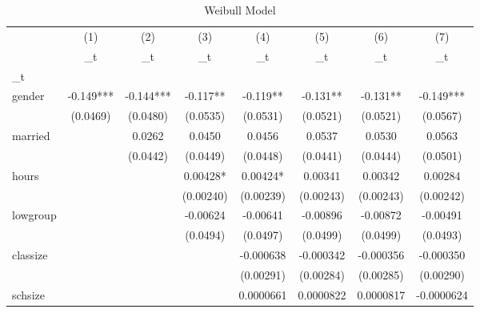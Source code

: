 \begin{table}[htbp]\centering
\def\sym#1{\ifmmode^{#1}\else\(^{#1}\)\fi}
\caption{Weibull Model}
\begin{tabular}{l*{7}{c}}
\hline\hline
            &\multicolumn{1}{c}{(1)}&\multicolumn{1}{c}{(2)}&\multicolumn{1}{c}{(3)}&\multicolumn{1}{c}{(4)}&\multicolumn{1}{c}{(5)}&\multicolumn{1}{c}{(6)}&\multicolumn{1}{c}{(7)}\\
            &\multicolumn{1}{c}{\_t}&\multicolumn{1}{c}{\_t}&\multicolumn{1}{c}{\_t}&\multicolumn{1}{c}{\_t}&\multicolumn{1}{c}{\_t}&\multicolumn{1}{c}{\_t}&\multicolumn{1}{c}{\_t}\\
\hline
\_t          &               &               &               &               &               &               &               \\
gender      &      -0.149***&      -0.144***&      -0.117** &      -0.119** &      -0.131** &      -0.131** &      -0.149***\\
            &    (0.0469)   &    (0.0480)   &    (0.0535)   &    (0.0531)   &    (0.0521)   &    (0.0521)   &    (0.0567)   \\
[1em]
married     &               &      0.0262   &      0.0450   &      0.0456   &      0.0537   &      0.0530   &      0.0563   \\
            &               &    (0.0442)   &    (0.0449)   &    (0.0448)   &    (0.0441)   &    (0.0444)   &    (0.0501)   \\
[1em]
hours       &               &               &     0.00428*  &     0.00424*  &     0.00341   &     0.00342   &     0.00284   \\
            &               &               &   (0.00240)   &   (0.00239)   &   (0.00243)   &   (0.00243)   &   (0.00242)   \\
[1em]
lowgroup    &               &               &    -0.00624   &    -0.00641   &    -0.00896   &    -0.00872   &    -0.00491   \\
            &               &               &    (0.0494)   &    (0.0497)   &    (0.0499)   &    (0.0499)   &    (0.0493)   \\
[1em]
classize    &               &               &               &   -0.000638   &   -0.000342   &   -0.000356   &   -0.000350   \\
            &               &               &               &   (0.00291)   &   (0.00284)   &   (0.00285)   &   (0.00290)   \\
[1em]
schsize     &               &               &               &   0.0000661   &   0.0000822   &   0.0000817   &  -0.0000624   \\

\end{tabular}
\end{table}
